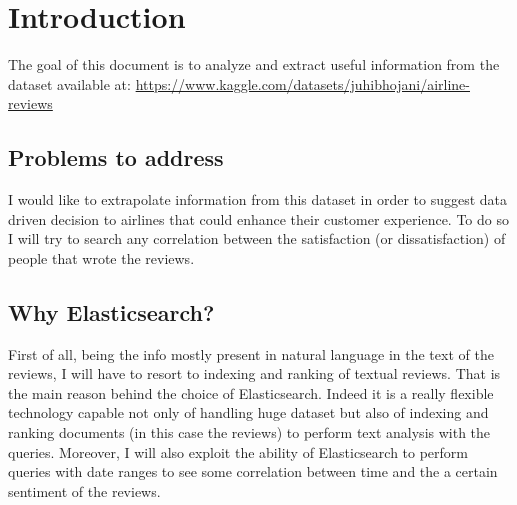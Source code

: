 \documentclass{Configuration_Files/PoliMi3i_thesis}
\begin{document}
\mainmatter %

\chapter{Introduction}
The goal of this document is to analyze and extract useful information from the dataset available at:
\newline 
\href{https://www.kaggle.com/datasets/juhibhojani/airline-reviews}{https://www.kaggle.com/datasets/juhibhojani/airline-reviews}
\section{Problems to address}
I would like to extrapolate information from this dataset in order to suggest data driven decision to airlines that could enhance their customer experience. To do so I will try to search any correlation between the satisfaction (or dissatisfaction) of people that wrote the reviews. 

\section {Why Elasticsearch?}

First of all, being the info mostly present in natural language in the text of the reviews, I will have to resort to indexing and ranking of textual reviews. That is the main reason behind the choice of Elasticsearch. Indeed it is a really flexible technology capable not only of handling huge dataset but also of indexing and ranking documents (in this case the reviews) to perform text analysis with the queries. Moreover, I will also exploit the ability of Elasticsearch to perform queries with date ranges to see some correlation between time and the a certain sentiment of the reviews.

\end{document}
